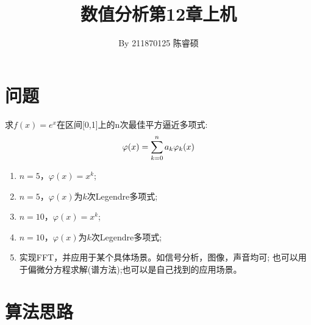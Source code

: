 \documentclass[a4paper,11pt,notitlepage]{article}
\title{\vspace{-1.5cm} \textbf{\huge{数值分析第12章上机}}\vspace{-1em}}
\author{By 211870125 陈睿硕}
\date{}
\begin{document}
\maketitle
\vspace{-1cm}
\thispagestyle{fancy}

\section{问题}
\begin{adjustwidth}{1em}{0pt}
    求$f(x)=e^x$在区间[0,1]上的n次最佳平方逼近多项式:
\begin{equation}
    \varphi (x)=\sum_{k=0}^{n}a_{k}\varphi_{k}(x) \notag
\end{equation}
\begin{enumerate}[label=\textbf{Q\arabic*}]
    \item $n=5$，$\varphi(x)=x^{k}$;\label{Q1}\notag
    \item $n=5$，$\varphi(x)$为$k$次Legendre多项式;\label{Q2}\notag
    \item $n=10$，$\varphi(x)=x^{k}$;\label{Q3}\notag
    \item $n=10$，$\varphi(x)$为$k$次Legendre多项式;\label{Q4}\notag
    \item 实现FFT，并应用于某个具体场景。如信号分析，图像，声音均可;
    也可以用于偏微分方程求解(谱方法);也可以是自己找到的应用场景。\label{Q5}\notag
\end{enumerate}
\end{adjustwidth}

\section{算法思路}
\end{document}
